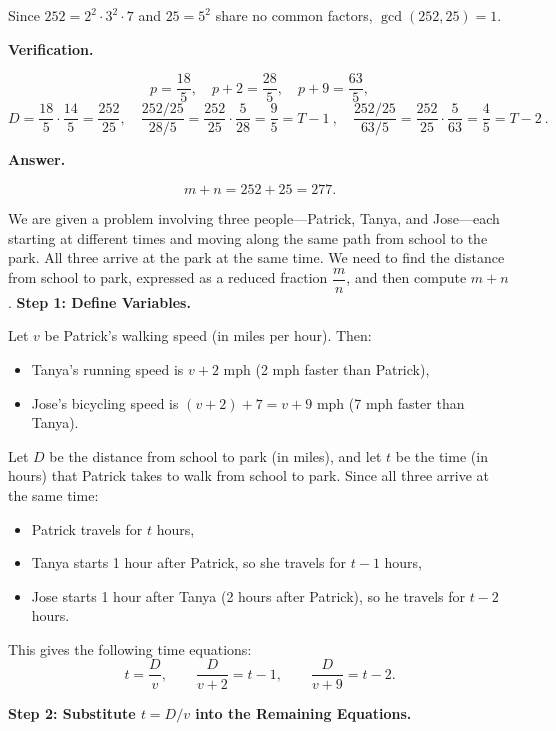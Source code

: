 \documentclass{article}
\begin{document}
\begin{tcolorbox}[title=The early training stage model (unscaled), breakable]
Since $252 = 2^2 \cdot 3^2 \cdot 7$ and $25 = 5^2$ share no common factors, $\gcd(252,25)=1$.

\medskip
\textbf{Verification.}

\[
p = \frac{18}{5},\quad p+2 = \frac{28}{5},\quad p+9 = \frac{63}{5},
\]
\[
D = \frac{18}{5}\cdot\frac{14}{5} = \frac{252}{25},\quad
\frac{252/25}{28/5} = \frac{252}{25}\cdot\frac{5}{28} = \frac{9}{5} = T-1\ ,\quad
\frac{252/25}{63/5} = \frac{252}{25}\cdot\frac{5}{63} = \frac{4}{5} = T-2\ .
\]

\medskip
\textbf{Answer.}

\[
m + n = 252 + 25 = \boxed{277}.
\]


\end{tcolorbox}


\begin{tcolorbox}[title=The early training stage model (scaled):, breakable]
We are given a problem involving three people---Patrick, Tanya, and Jose---each
starting at different times and moving along the same path from school to the
park. All three arrive at the park at the same time. We need to find the distance from school to park, expressed as a reduced fraction $\dfrac{m}{n}$,
and then compute $m+n$.              
\medskip
\textbf{Step 1: Define Variables.}

Let $v$ be Patrick's walking speed (in miles per hour). Then:
\begin{itemize}
  \item Tanya's running speed is $v+2$ mph (2 mph faster than Patrick),
  \item Jose's bicycling speed is $(v+2)+7 = v+9$ mph (7 mph faster than Tanya).
\end{itemize}
Let $D$ be the distance from school to park (in miles), and let $t$ be the
time (in hours) that Patrick takes to walk from school to park. Since all three
arrive at the same time:
\begin{itemize}
  \item Patrick travels for $t$ hours,
  \item Tanya starts 1 hour after Patrick, so she travels for $t-1$ hours,
  \item Jose starts 1 hour after Tanya (2 hours after Patrick), so he travels
        for $t-2$ hours.
\end{itemize}
This gives the following time equations:
\[
t = \frac{D}{v}, \qquad
\frac{D}{v+2} = t-1, \qquad
\frac{D}{v+9} = t-2.
\]

\medskip                                                                                                                                                                      
\textbf{Step 2: Substitute $t = D/v$ into the Remaining Equations.}
 

\end{tcolorbox}
\end{document}

